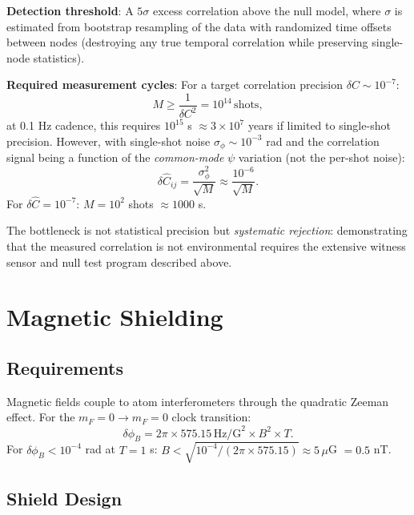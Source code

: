 \documentclass[12pt,a4paper]{article}
\begin{document}
\textbf{Detection threshold}: A $5\sigma$ excess correlation above the
null model, where $\sigma$ is estimated from bootstrap resampling of the
data with randomized time offsets between nodes (destroying any true
temporal correlation while preserving single-node statistics).

\textbf{Required measurement cycles}: For a target correlation precision
$\delta C \sim 10^{-7}$:
\begin{equation}
M \geq \frac{1}{\delta C^2} = 10^{14}\,\text{shots},
\end{equation}
at 0.1 Hz cadence, this requires $10^{15}$ s $\approx 3 \times 10^7$ years
if limited to single-shot precision. However, with single-shot noise
$\sigma_\phi \sim 10^{-3}$ rad and the correlation signal being a function
of the \emph{common-mode} $\psi$ variation (not the per-shot noise):
\begin{equation}
\delta\hat{C}_{ij} = \frac{\sigma_\phi^2}{\sqrt{M}} \approx \frac{10^{-6}}{\sqrt{M}}.
\end{equation}
For $\delta\hat{C} = 10^{-7}$: $M = 10^{2}$ shots $\approx 1000$ s.

The bottleneck is not statistical precision but \emph{systematic rejection}:
demonstrating that the measured correlation is not environmental requires
the extensive witness sensor and null test program described above.


\section{Magnetic Shielding}\label{sec:shielding}

\subsection{Requirements}

Magnetic fields couple to atom interferometers through the quadratic
Zeeman effect. For the $m_F = 0 \to m_F = 0$ clock transition:
\begin{equation}
\delta\phi_B = 2\pi \times 575.15\,\text{Hz/G}^2 \times B^2 \times T.
\end{equation}
For $\delta\phi_B < 10^{-4}$ rad at $T = 1$ s:
$B < \sqrt{10^{-4}/(2\pi \times 575.15)} \approx 5\,\mu$G $= 0.5$ nT.

\subsection{Shield Design}
\end{document}
